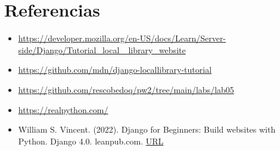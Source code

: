 \documentclass{article}
\begin{document}
\clearpage

\section{Referencias}
\begin{itemize}			
	\item \url{https://developer.mozilla.org/en-US/docs/Learn/Server-side/Django/Tutorial\_local\_
library\_website}
	\item \url{https://github.com/mdn/django-locallibrary-tutorial}
        \item \url{https://github.com/rescobedoq/pw2/tree/main/labs/lab05}
        \item \url{https://realpython.com/}
        \item William S. Vincent. (2022). Django for Beginners: Build websites with Python. Django 4.0.
leanpub.com. \href{http://library.lol/main/22AF742D96697DE55EF5F88B08F1AA86}{URL}
\end{itemize}	
	
%
%
%
			
\end{document}
